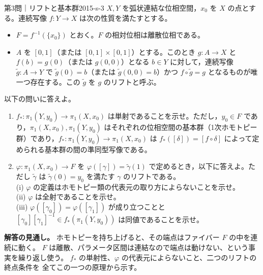 \begin{problem}{第3問｜リフトと基本群}{2015-s-3}
$X,Y$ を弧状連結な位相空間，$x_0$ を $X$ の点とする。連続写像 $f:Y\to X$ は次の性質を満たすとする。
\begin{itemize}
  \item $F=f^{-1}(\{x_0\})$ とおく。$F$ の相対位相は離散位相である。
  \item $A$ を $[0,1]$（または $[0,1]\times[0,1]$）とする。このとき $g:A\to X$ と $f(b)=g(0)$（または $g(0,0)$）となる $b\in Y$ に対して，連続写像 $\tilde g:A\to Y$ で $\tilde g(0)=b$（または $\tilde g(0,0)=b$）かつ $f\circ\tilde g=g$ となるものが唯一つ存在する。この $\tilde g$ を $g$ のリフトと呼ぶ。
\end{itemize}
以下の問いに答えよ。
\begin{enumerate}
  \item[(1)] $f_*:\pi_1(Y,y_0)\to\pi_1(X,x_0)$ は単射であることを示せ。ただし，$y_0\in F$ であり，$\pi_1(X,x_0),\pi_1(Y,y_0)$ はそれぞれの位相空間の基本群（1次ホモトピー群）であり，$f_*:\pi_1(Y,y_0)\to\pi_1(X,x_0)$ は $f_*([\delta])=[f\circ\delta]$ によって定められる基本群の間の準同型写像である。
  \item[(2)] $\varphi:\pi_1(X,x_0)\to F$ を $\varphi([\gamma])=\tilde\gamma(1)$ で定めるとき，以下に答えよ。ただし $\tilde\gamma$ は $\tilde\gamma(0)=y_0$ を満たす $\gamma$ のリフトである。\\
  (i) $\varphi$ の定義はホモトピー類の代表元の取り方によらないことを示せ。\\
  (ii) $\varphi$ は全射であることを示せ。\\
  (iii) $\varphi([\gamma_0])=\varphi([\gamma_1])$ が成り立つことと $[\gamma_0][\gamma_1]^{-1}\in f_*(\pi_1(Y,y_0))$ は同値であることを示せ。
\end{enumerate}
\end{problem}
\begin{memo*}
\textbf{解答の見通し。}
ホモトピーを持ち上げると、その端点はファイバー $F$ の中を連続に動く。
$F$ は離散、パラメータ区間は連結なので端点は動けない、という事実を繰り返し使う。
$f_*$ の単射性、$\varphi$ の代表元によらないこと、二つのリフトの終点条件を
全てこの一つの原理から示す。
\end{memo*}
